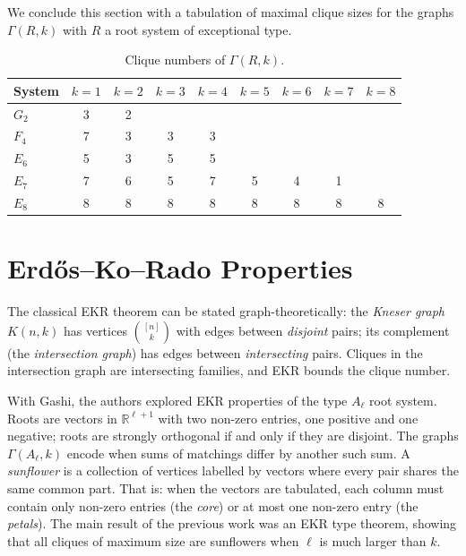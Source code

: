 \documentclass[11pt]{article}
\begin{document}
We conclude this section with a tabulation of maximal clique sizes for the graphs $\Gamma(R, k)$ with $R$ a root system of exceptional type.

\begin{table}[h]
\centering
\begin{tabular}{lcccccccc}
\toprule
System & $k=1$ & $k=2$ & $k=3$ & $k=4$ & $k=5$ & $k=6$ & $k=7$ & $k=8$ \\
\midrule
$G_2$ & 3 & 2 & & & & & & \\
$F_4$ & 7 & 3 & 3 & 3 & & & & \\
$E_6$ & 5 & 3 & 5 & 5 & & & & \\
$E_7$ & 7 & 6 & 5 & 7 & 5 & 4 & 1 & \\
$E_8$ & 8 & 8 & 8 & 8 & 8 & 8 & 8 & 8 \\
\bottomrule
\end{tabular}
\caption{Clique numbers of $\Gamma(R, k)$.}
\label{tab:clique}
\end{table}



\section{Erd\H{o}s--Ko--Rado Properties}\label{sec:ekr}

The classical EKR theorem can be stated graph-theoretically: the \emph{Kneser graph} $K(n,k)$ has vertices $\binom{[n]}{k}$ with edges between \emph{disjoint} pairs; its complement (the \emph{intersection graph}) has edges between \emph{intersecting} pairs. Cliques in the intersection graph are intersecting families, and EKR bounds the clique number.

With Gashi, the authors explored EKR properties of the type $A_\ell$ root system. Roots are vectors in $\mathbb{R}^{\ell + 1}$ with two non-zero entries, one positive and one negative; roots are strongly orthogonal if and only if they are disjoint. The graphs $\Gamma(A_\ell, k)$ encode when sums of matchings differ by another such sum. A \emph{sunflower} is a collection of vertices labelled by vectors where every pair shares the same common part. That is: when the vectors are tabulated, each column must contain only non-zero entries (the \textit{core}) or at most one non-zero entry (the \textit{petals}). The main result of the previous work was an EKR type theorem, showing that all cliques of maximum size are sunflowers when $\ell$ is much larger than $k$.
\end{document}
